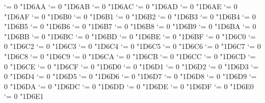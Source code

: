 {  \Umathcode `\Γ = 0 \unimathfam "1D6AA
  \Umathcode `\Δ = 0 \unimathfam "1D6AB
  \Umathcode `\Ε = 0 \unimathfam "1D6AC
  \Umathcode `\Ζ = 0 \unimathfam "1D6AD
  \Umathcode `\Η = 0 \unimathfam "1D6AE
  \Umathcode `\Θ = 0 \unimathfam "1D6AF
  \Umathcode `\Ι = 0 \unimathfam "1D6B0
  \Umathcode `\Κ = 0 \unimathfam "1D6B1
  \Umathcode `\Λ = 0 \unimathfam "1D6B2
  \Umathcode `\Μ = 0 \unimathfam "1D6B3
  \Umathcode `\Ν = 0 \unimathfam "1D6B4
  \Umathcode `\Ξ = 0 \unimathfam "1D6B5
  \Umathcode `\Ο = 0 \unimathfam "1D6B6
  \Umathcode `\Π = 0 \unimathfam "1D6B7
  \Umathcode `\Ρ = 0 \unimathfam "1D6B8
  \Umathcode `\ϴ = 0 \unimathfam "1D6B9
  \Umathcode `\Σ = 0 \unimathfam "1D6BA
  \Umathcode `\Τ = 0 \unimathfam "1D6BB
  \Umathcode `\Υ = 0 \unimathfam "1D6BC
  \Umathcode `\Φ = 0 \unimathfam "1D6BD
  \Umathcode `\Χ = 0 \unimathfam "1D6BE
  \Umathcode `\Ψ = 0 \unimathfam "1D6BF
  \Umathcode `\Ω = 0 \unimathfam "1D6C0
  \Umathcode `\α = 0 \unimathfam "1D6C2
  \Umathcode `\β = 0 \unimathfam "1D6C3
  \Umathcode `\γ = 0 \unimathfam "1D6C4
  \Umathcode `\δ = 0 \unimathfam "1D6C5
  \Umathcode `\ε = 0 \unimathfam "1D6C6
  \Umathcode `\ζ = 0 \unimathfam "1D6C7
  \Umathcode `\η = 0 \unimathfam "1D6C8
  \Umathcode `\θ = 0 \unimathfam "1D6C9
  \Umathcode `\ι = 0 \unimathfam "1D6CA
  \Umathcode `\κ = 0 \unimathfam "1D6CB
  \Umathcode `\λ = 0 \unimathfam "1D6CC
  \Umathcode `\μ = 0 \unimathfam "1D6CD
  \Umathcode `\ν = 0 \unimathfam "1D6CE
  \Umathcode `\ξ = 0 \unimathfam "1D6CF
  \Umathcode `\ο = 0 \unimathfam "1D6D0
  \Umathcode `\π = 0 \unimathfam "1D6D1
  \Umathcode `\ρ = 0 \unimathfam "1D6D2
  \Umathcode `\ς = 0 \unimathfam "1D6D3
  \Umathcode `\σ = 0 \unimathfam "1D6D4
  \Umathcode `\τ = 0 \unimathfam "1D6D5
  \Umathcode `\υ = 0 \unimathfam "1D6D6
  \Umathcode `\ϕ = 0 \unimathfam "1D6D7
  \Umathcode `\χ = 0 \unimathfam "1D6D8
  \Umathcode `\ψ = 0 \unimathfam "1D6D9
  \Umathcode `\ω = 0 \unimathfam "1D6DA
  \Umathcode `\ϵ = 0 \unimathfam "1D6DC
  \Umathcode `\ϑ = 0 \unimathfam "1D6DD
  \Umathcode `\ϰ = 0 \unimathfam "1D6DE
  \Umathcode `\φ = 0 \unimathfam "1D6DF
  \Umathcode `\ϱ = 0 \unimathfam "1D6E0
  \Umathcode `\ϖ = 0 \unimathfam "1D6E1
\fi
\tenbf}

